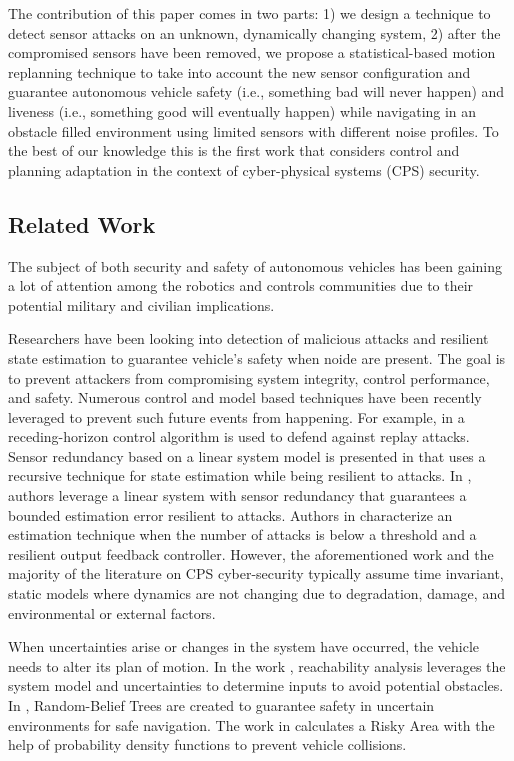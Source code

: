 The contribution of this paper comes in two parts: 1) we design a technique to detect sensor attacks on an unknown, dynamically changing system, 2) after the compromised sensors have been removed, we propose a statistical-based motion replanning technique to take into account the new sensor configuration and  guarantee autonomous vehicle safety (i.e., something bad will never happen) and liveness (i.e., something good will eventually happen) while navigating in an obstacle filled environment using limited sensors with different noise profiles. 
To the best of our knowledge this is the first work that considers control and planning adaptation in the context of cyber-physical systems (CPS) security.



\subsection{Related Work}
\label{sec:Related Work}

The subject of both security and safety of autonomous vehicles has been gaining a lot of attention among the robotics  and controls communities due to their potential military and civilian implications.

Researchers have been looking into detection of malicious attacks and resilient state estimation to guarantee vehicle's safety when noide are present. The goal is to prevent attackers from compromising system integrity, control performance, and safety. Numerous control and model based techniques have been recently leveraged to prevent such future events from happening. For example, in \cite{zhu2012resilient} a receding-horizon control algorithm is used to defend against replay attacks. Sensor redundancy based on a linear system model is presented in \cite{6943080} that uses a recursive technique for state estimation while being resilient to attacks. In \cite{7330811}, authors leverage a linear system with sensor redundancy that guarantees a bounded estimation error resilient to attacks. Authors in \cite{fawzi2014secure} characterize an estimation technique when the number of attacks is below a threshold and a resilient output feedback controller. However, the aforementioned work and the majority of the literature on CPS cyber-security typically assume time invariant, static models where dynamics are not changing due to degradation, damage, and environmental or external factors.


When uncertainties arise or changes in the system have occurred, the vehicle needs to alter its plan of motion. In the work \cite{8046382}, reachability analysis leverages the system model and uncertainties to determine inputs to avoid potential obstacles. In \cite{5980508}, Random-Belief Trees are created to guarantee safety in uncertain environments for safe navigation. The work in \cite{6934041} calculates a Risky Area with the help of probability density functions to prevent vehicle collisions. 


